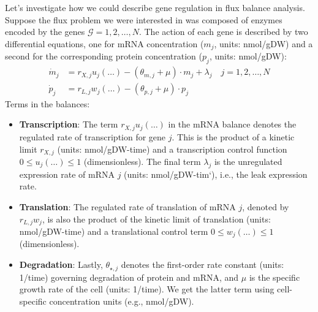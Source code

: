 \documentclass{article}[11pt]
\begin{document}
Let's investigate how we could describe gene regulation in flux balance analysis. 
Suppose the flux problem we were interested in was composed of enzymes encoded by the genes $\mathcal{G}=1,2,\dots, N$.
The action of each gene is described by two differential equations, one for mRNA concentration ($m_{j}$, units: nmol/gDW) 
and a second for the corresponding protein concentration ($p_{j}$, units: nmol/gDW):
\begin{align*}
	\dot{m}_{j} &= r_{X,j}u_{j}\left(\dots\right) - \left(\theta_{m,j}+\mu\right)\cdot{m_{j}}+\lambda_{j}\quad{j=1,2,\dots,N}\\
	\dot{p}_{j} &= r_{L,j}w_{j}\left(\dots\right) - \left(\theta_{p,j}+\mu\right)\cdot{p_{j}}
\end{align*}
Terms in the balances:
\begin{itemize}[leftmargin=16pt]
\item{\textbf{Transcription}: The term $r_{X,j}u_{j}\left(\dots\right)$ in the mRNA balance denotes the regulated rate of transcription for gene $j$. This is 
the product of a kinetic limit $r_{X,j}$ (units: nmol/gDW-time) and a transcription control function $0\leq{u_{j}\left(\dots\right)}\leq{1}$ (dimensionless).
The final term $\lambda_{j}$ is the unregulated expression rate of mRNA $j$ (units: nmol/gDW-tim`), i.e., the leak expression rate.}
\item{\textbf{Translation}: The regulated rate of translation of mRNA $j$, denoted by $r_{L,j}w_{j}$, is also the product of the
kinetic limit of translation (units: nmol/gDW-time) and a translational control term $0\leq{w_{j}\left(\dots\right)}\leq{1}$ (dimensionless).}
\item{\textbf{Degradation}: Lastly, $\theta_{\star,j}$ denotes the first-order rate constant (units: 1/time) governing degradation of protein and mRNA, and $\mu$ 
is the specific growth rate of the cell (units: 1/time). We get the latter term using cell-specific concentration units (e.g., nmol/gDW).}
\end{itemize}
\end{document}
